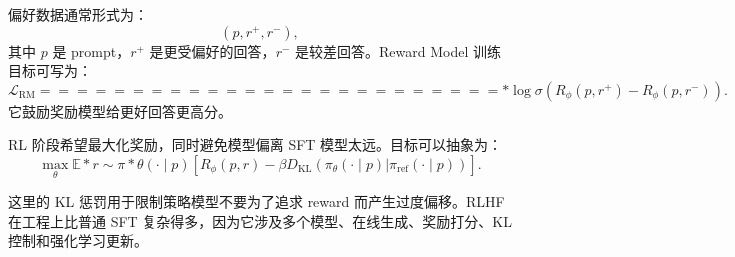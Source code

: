 偏好数据通常形式为：
\[
(p, r^+, r^-),
\]
其中 $p$ 是 prompt，$r^+$ 是更受偏好的回答，$r^-$ 是较差回答。Reward Model 训练目标可写为：
\[
\mathcal{L}_{\mathrm{RM}}
=========================

*

\log
\sigma
\left(
R_{\phi}(p,r^+)-R_{\phi}(p,r^-)
\right).
\]
它鼓励奖励模型给更好回答更高分。

RL 阶段希望最大化奖励，同时避免模型偏离 SFT 模型太远。目标可以抽象为：
\[
\max_{\theta}
\mathbb{E}*{r\sim \pi*{\theta}(\cdot\mid p)}
\left[
R_{\phi}(p,r)
-
\beta
D_{\mathrm{KL}}
\left(
\pi_{\theta}(\cdot\mid p)
|
\pi_{\mathrm{ref}}(\cdot\mid p)
\right)
\right].
\]

这里的 KL 惩罚用于限制策略模型不要为了追求 reward 而产生过度偏移。RLHF 在工程上比普通 SFT 复杂得多，因为它涉及多个模型、在线生成、奖励打分、KL 控制和强化学习更新。

